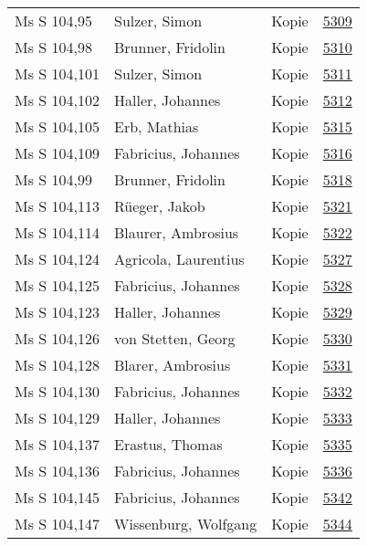 \documentclass[10pt,a4paper,landscape]{report}
\begin{document}
\begin{longtable}{p{16cm}p{4cm}lr}
Ms S 104,95	&	Sulzer, Simon	&	Kopie	&	\href{http://130.60.24.72/assignment/5309}{5309}\\
Ms S 104,98	&	Brunner, Fridolin	&	Kopie	&	\href{http://130.60.24.72/assignment/5310}{5310}\\
Ms S 104,101	&	Sulzer, Simon	&	Kopie	&	\href{http://130.60.24.72/assignment/5311}{5311}\\
Ms S 104,102	&	Haller, Johannes	&	Kopie	&	\href{http://130.60.24.72/assignment/5312}{5312}\\
Ms S 104,105	&	Erb, Mathias	&	Kopie	&	\href{http://130.60.24.72/assignment/5315}{5315}\\
Ms S 104,109	&	Fabricius, Johannes	&	Kopie	&	\href{http://130.60.24.72/assignment/5316}{5316}\\
Ms S 104,99	&	Brunner, Fridolin	&	Kopie	&	\href{http://130.60.24.72/assignment/5318}{5318}\\
Ms S 104,113	&	Rüeger, Jakob	&	Kopie	&	\href{http://130.60.24.72/assignment/5321}{5321}\\
Ms S 104,114	&	Blaurer, Ambrosius	&	Kopie	&	\href{http://130.60.24.72/assignment/5322}{5322}\\
Ms S 104,124	&	Agricola, Laurentius	&	Kopie	&	\href{http://130.60.24.72/assignment/5327}{5327}\\
Ms S 104,125	&	Fabricius, Johannes	&	Kopie	&	\href{http://130.60.24.72/assignment/5328}{5328}\\
Ms S 104,123	&	Haller, Johannes	&	Kopie	&	\href{http://130.60.24.72/assignment/5329}{5329}\\
Ms S 104,126	&	von Stetten, Georg	&	Kopie	&	\href{http://130.60.24.72/assignment/5330}{5330}\\
Ms S 104,128	&	Blarer, Ambrosius	&	Kopie	&	\href{http://130.60.24.72/assignment/5331}{5331}\\
Ms S 104,130	&	Fabricius, Johannes	&	Kopie	&	\href{http://130.60.24.72/assignment/5332}{5332}\\
Ms S 104,129	&	Haller, Johannes	&	Kopie	&	\href{http://130.60.24.72/assignment/5333}{5333}\\
Ms S 104,137	&	Erastus, Thomas	&	Kopie	&	\href{http://130.60.24.72/assignment/5335}{5335}\\
Ms S 104,136	&	Fabricius, Johannes	&	Kopie	&	\href{http://130.60.24.72/assignment/5336}{5336}\\
Ms S 104,145	&	Fabricius, Johannes	&	Kopie	&	\href{http://130.60.24.72/assignment/5342}{5342}\\
Ms S 104,147	&	Wissenburg, Wolfgang	&	Kopie	&	\href{http://130.60.24.72/assignment/5344}{5344}\\

\end{longtable}
\end{document}
